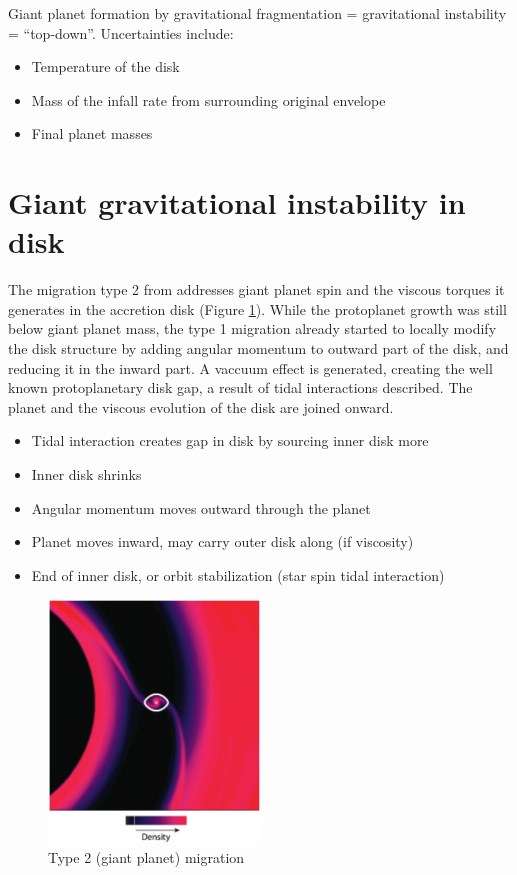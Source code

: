 \documentclass[12pt]{article} %
\begin{document}
\noindent Giant planet formation by gravitational fragmentation = gravitational instability = “top-down”. Uncertainties include:
\begin{itemize}
\setlength\itemsep{0em}
\item Temperature of the disk
\item Mass of the infall rate from surrounding original envelope
\item Final planet masses
\end{itemize}

\section{Giant gravitational instability in disk}\vspace{-2ex}\titlerule[1pt]\bigskip

The migration type 2 from \cite{chambers2009planetary} addresses giant planet spin and the viscous torques it generates in the accretion disk (Figure \ref{chambers2009}). While the protoplanet growth was still below giant planet mass, the type 1 migration already started to locally modify the disk structure by adding angular momentum to outward part of the disk, and reducing it in the inward part. A vaccuum effect is generated, creating the well known protoplanetary disk gap, a result of tidal interactions described. The planet and the viscous evolution of the disk are joined onward.

\begin{itemize}
\setlength\itemsep{0em}
\item Tidal interaction creates gap in disk by sourcing inner disk more
\item Inner disk shrinks
\item Angular momentum moves outward through the planet
\item Planet moves inward, may carry outer disk along (if viscosity)
\item End of inner disk, or orbit stabilization (star spin tidal interaction)
\end{itemize}

\begin{figure}
\begin{center}
 \includegraphics[width=0.5\textwidth,keepaspectratio=true]{./images/chambers2009}
 \caption{Type 2 (giant planet) migration \cite{chambers2009planetary}}
 \label{chambers2009}
\end{center}
\end{figure}
\end{document}

